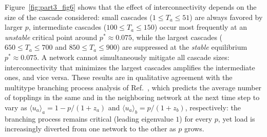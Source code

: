 \noindent Figure~\ref{fig:part3_fig6} shows that the effect of interconnectivity depends on the size of the cascade considered: small cascades ($1\le T_a\le51$) are always favored by larger $p$, intermediate cascades ($100\le T_a\le150$) occur most frequently at an \emph{unstable} critical point around $p^{*}\approx0.075$, while the largest cascades ($650\le T_a\le700$ and $850\le T_a\le900$) are suppressed at the \emph{stable} equilibrium $p^{*}\approx0.075$.
A network cannot simultaneously mitigate all cascade sizes: interconnectivity that minimizes the largest cascades amplifies the intermediate ones, and vice versa.
These results are in qualitative agreement with the multitype branching process analysis of Ref.~\cite{doi:10.1073/pnas.1110586109}, which predicts the average number of topplings in the same and in the neighboring network at the next time step to vary as $\langle u_a\rangle_a = 1 - p/(1+z_a)$ and $\langle u_a\rangle_b = p/(1+z_b)$, respectively: the branching process remains critical (leading eigenvalue $1$) for every $p$, yet load is increasingly diverted from one network to the other as $p$ grows.
\newpage